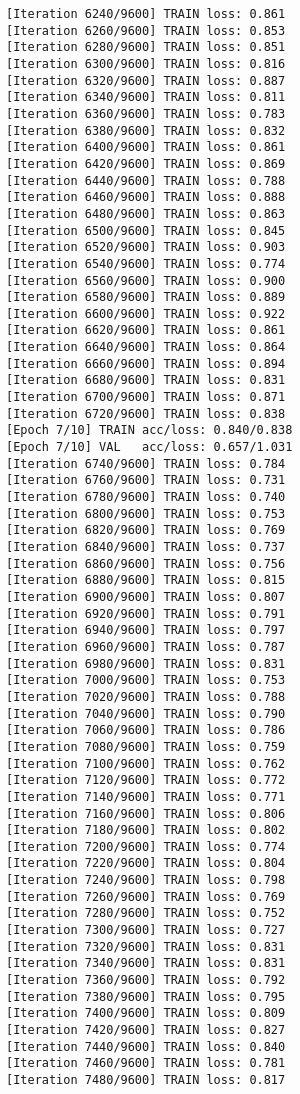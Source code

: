 \documentclass[11pt]{article}
\begin{document}
\begin{Verbatim}[commandchars=\\\{\}]
[Iteration 6240/9600] TRAIN loss: 0.861
[Iteration 6260/9600] TRAIN loss: 0.853
[Iteration 6280/9600] TRAIN loss: 0.851
[Iteration 6300/9600] TRAIN loss: 0.816
[Iteration 6320/9600] TRAIN loss: 0.887
[Iteration 6340/9600] TRAIN loss: 0.811
[Iteration 6360/9600] TRAIN loss: 0.783
[Iteration 6380/9600] TRAIN loss: 0.832
[Iteration 6400/9600] TRAIN loss: 0.861
[Iteration 6420/9600] TRAIN loss: 0.869
[Iteration 6440/9600] TRAIN loss: 0.788
[Iteration 6460/9600] TRAIN loss: 0.888
[Iteration 6480/9600] TRAIN loss: 0.863
[Iteration 6500/9600] TRAIN loss: 0.845
[Iteration 6520/9600] TRAIN loss: 0.903
[Iteration 6540/9600] TRAIN loss: 0.774
[Iteration 6560/9600] TRAIN loss: 0.900
[Iteration 6580/9600] TRAIN loss: 0.889
[Iteration 6600/9600] TRAIN loss: 0.922
[Iteration 6620/9600] TRAIN loss: 0.861
[Iteration 6640/9600] TRAIN loss: 0.864
[Iteration 6660/9600] TRAIN loss: 0.894
[Iteration 6680/9600] TRAIN loss: 0.831
[Iteration 6700/9600] TRAIN loss: 0.871
[Iteration 6720/9600] TRAIN loss: 0.838
[Epoch 7/10] TRAIN acc/loss: 0.840/0.838
[Epoch 7/10] VAL   acc/loss: 0.657/1.031
[Iteration 6740/9600] TRAIN loss: 0.784
[Iteration 6760/9600] TRAIN loss: 0.731
[Iteration 6780/9600] TRAIN loss: 0.740
[Iteration 6800/9600] TRAIN loss: 0.753
[Iteration 6820/9600] TRAIN loss: 0.769
[Iteration 6840/9600] TRAIN loss: 0.737
[Iteration 6860/9600] TRAIN loss: 0.756
[Iteration 6880/9600] TRAIN loss: 0.815
[Iteration 6900/9600] TRAIN loss: 0.807
[Iteration 6920/9600] TRAIN loss: 0.791
[Iteration 6940/9600] TRAIN loss: 0.797
[Iteration 6960/9600] TRAIN loss: 0.787
[Iteration 6980/9600] TRAIN loss: 0.831
[Iteration 7000/9600] TRAIN loss: 0.753
[Iteration 7020/9600] TRAIN loss: 0.788
[Iteration 7040/9600] TRAIN loss: 0.790
[Iteration 7060/9600] TRAIN loss: 0.786
[Iteration 7080/9600] TRAIN loss: 0.759
[Iteration 7100/9600] TRAIN loss: 0.762
[Iteration 7120/9600] TRAIN loss: 0.772
[Iteration 7140/9600] TRAIN loss: 0.771
[Iteration 7160/9600] TRAIN loss: 0.806
[Iteration 7180/9600] TRAIN loss: 0.802
[Iteration 7200/9600] TRAIN loss: 0.774
[Iteration 7220/9600] TRAIN loss: 0.804
[Iteration 7240/9600] TRAIN loss: 0.798
[Iteration 7260/9600] TRAIN loss: 0.769
[Iteration 7280/9600] TRAIN loss: 0.752
[Iteration 7300/9600] TRAIN loss: 0.727
[Iteration 7320/9600] TRAIN loss: 0.831
[Iteration 7340/9600] TRAIN loss: 0.831
[Iteration 7360/9600] TRAIN loss: 0.792
[Iteration 7380/9600] TRAIN loss: 0.795
[Iteration 7400/9600] TRAIN loss: 0.809
[Iteration 7420/9600] TRAIN loss: 0.827
[Iteration 7440/9600] TRAIN loss: 0.840
[Iteration 7460/9600] TRAIN loss: 0.781
[Iteration 7480/9600] TRAIN loss: 0.817

\end{Verbatim}
\end{document}
